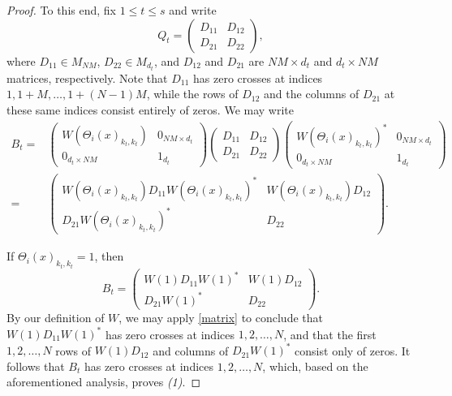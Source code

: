 \documentclass[12pt]{amsart}
\numberwithin{equation}{section}
\theoremstyle{definition}
\theoremstyle{remark}
\begin{document}
\begin{proof}
	To this end, fix $1\leq t\leq s$ and write
	$$
	Q_{t}=
	\begin{pmatrix}
	D_{11} & D_{12}\\
	D_{21} & D_{22}
	\end{pmatrix},
	$$
	where $D_{11}\in M_{NM}$, $D_{22}\in M_{d_{t}}$, and $D_{12}$ and $D_{21}$ are $NM\times d_{t}$ and $d_{t}\times NM$ matrices, respectively. Note that $D_{11}$ has zero crosses at indices $1,1+M,\ldots,1+(N-1)M$, while the rows of $D_{12}$ and the columns of $D_{21}$ at these same indices consist entirely of zeros. We may write
	$$\begin{aligned}
	B_{t}=&
	\begin{pmatrix}
	W(\Theta_{i}(x)_{k_{t},k_{t}}) & 0_{NM\times d_{t}}\\
	0_{d_{t}\times NM} & 1_{d_{t}}
	\end{pmatrix}
	\begin{pmatrix}
	D_{11} & D_{12}\\
	D_{21} & D_{22}
	\end{pmatrix}
	\begin{pmatrix}
	W(\Theta_{i}(x)_{k_{t},k_{t}})^{*} & 0_{NM\times d_{t}}\\
	0_{d_{t}\times NM} & 1_{d_{t}}
	\end{pmatrix}\\
	=&\begin{pmatrix}
	W(\Theta_{i}(x)_{k_{t},k_{t}})D_{11}W(\Theta_{i}(x)_{k_{t},k_{t}})^{*} & W(\Theta_{i}(x)_{k_{t},k_{t}})D_{12}\\
	D_{21}W(\Theta_{i}(x)_{k_{t},k_{t}})^{*} & D_{22}
	\end{pmatrix}.
	\end{aligned}
	$$%
	
	If $\Theta_{i}(x)_{k_{t},k_{t}}=1$, then 
	$$
	B_{t}=
	\begin{pmatrix}
	W(1)D_{11}W(1)^{*} & W(1)D_{12}\\
	D_{21}W(1)^{*} & D_{22}
	\end{pmatrix}.
	$$
	By our definition of $W$, we may apply \autoref{matrix} to conclude that $W(1)D_{11}W(1)^{*}$ has zero crosses at indices $1,2,\ldots,N$, and that the first $1,2,\ldots, N$ rows of $W(1)D_{12}$ and columns of $D_{21}W(1)^{*}$ consist only of zeros. It follows that $B_{t}$ has zero crosses at indices $1,2,\ldots, N$, which, based on the aforementioned analysis, proves \textit{(1)}. 
	

\end{proof}
\end{document}
